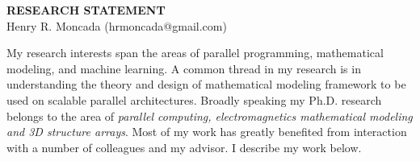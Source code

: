 \documentclass[a4paper, 11pt]{article}
\begin{document}
\thispagestyle{fancy}
\lhead{}
\rhead{}
\renewcommand{\headrulewidth}{0pt} 
\renewcommand{\footrulewidth}{0pt} 
\fancyfoot[C]{\footnotesize \textcolor{gray}{ }} 


\pagestyle{fancy}
\lhead{\textcolor{gray}{\it Henry R. Moncada}}
\rhead{\textcolor{gray}{\thepage/\totalpages{}}}

\begin{small}

\begin{center}
{\LARGE \bf RESEARCH STATEMENT}\\
\vspace*{0.1cm}
{\normalsize Henry R. Moncada (hrmoncada@gmail.com)}
\end{center}



My research interests span the areas of parallel programming, mathematical modeling, and machine learning. 
A common thread in my research is in understanding the theory and design of mathematical modeling framework 
to be used on scalable parallel architectures. Broadly speaking my Ph.D. research belongs to the area of 
{\it parallel computing, electromagnetics mathematical modeling and 3D structure arrays}. 
Most of my work has greatly benefited from interaction with a number of colleagues and my advisor.
I describe my work below.


\end{small}
\end{document}
